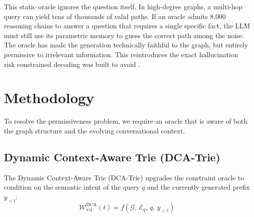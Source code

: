 \documentclass[11pt, letterpaper]{article}
\begin{document}
This static oracle ignores the question itself. In high-degree graphs, a multi-hop query can yield tens of thousands of valid paths. If an oracle admits 8,000 reasoning chains to answer a question that requires a single specific fact, the LLM must still use its parametric memory to guess the correct path among the noise. The oracle has made the generation technically faithful to the graph, but entirely permissive to irrelevant information. This reintroduces the exact hallucination risk constrained decoding was built to avoid \citep{li2024-decoding-on-graphs}.

\section{Methodology}

To resolve the permissiveness problem, we require an oracle that is aware of both the graph structure and the evolving conversational context.

\subsection{Dynamic Context-Aware Trie (DCA-Trie)}

The Dynamic Context-Aware Trie (DCA-Trie) upgrades the constraint oracle to condition on the semantic intent of the query $q$ and the currently generated prefix $y_{<t}$:
\begin{equation}
    \mathcal{W}_{\text{val}}^{\text{DCA}}(t) = f(\mathcal{G},\, \mathcal{E}_q,\, q,\, y_{<t})
\end{equation}
\end{document}
